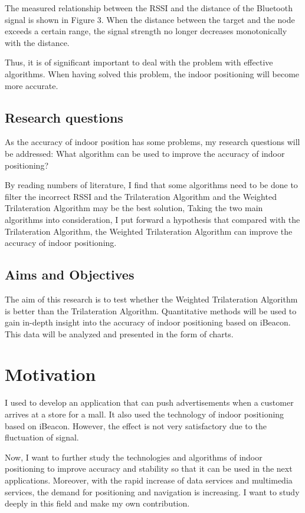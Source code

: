 \documentclass{sigchi}
\begin{document}
The measured relationship between the RSSI and the distance of the Bluetooth signal is shown in Figure 3. When the distance between the target and the node exceeds a certain range, the signal strength no longer decreases monotonically with the distance.

Thus, it is of significant important to deal with the problem with effective algorithms. When having solved this problem, the indoor positioning will become more accurate.

\subsection{Research questions}

As the accuracy of indoor position has some problems, my research questions will be addressed: What algorithm can be used to improve the accuracy of indoor positioning?

By reading numbers of literature, I find that some algorithms need to be done to filter the incorrect RSSI and the Trilateration Algorithm and the Weighted Trilateration Algorithm may be the best solution, Taking the two main algorithms into consideration, I put forward a hypothesis that compared with the Trilateration Algorithm, the Weighted Trilateration Algorithm can improve the accuracy of indoor positioning.

\subsection{Aims and Objectives}

The aim of this research is to test whether the Weighted Trilateration Algorithm is better than the Trilateration Algorithm.
Quantitative methods will be used to gain in-depth insight into the accuracy of indoor positioning based on iBeacon. This data will be analyzed and presented in the form of charts.

\section{Motivation}
 I used to develop an application that can push advertisements when a customer arrives at a store for a mall. It also used the technology of indoor positioning based on iBeacon. However, the effect is not very satisfactory due to the fluctuation of signal.
 
 Now, I want to further study the technologies and algorithms of indoor positioning to improve accuracy and stability so that it can be used in the next applications. Moreover, with the rapid increase of data services and multimedia services, the demand for positioning and navigation is increasing. I want to study deeply in this field and make my own contribution.
 
\end{document}
